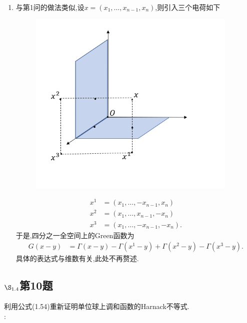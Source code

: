 \documentclass[12pt, a4paper]{ctexbook}
\begin{document}
\begin{enumerate}
        \item 与第1问的做法类似,设$x=(x_1, \dots ,x_{n−1}, x_n)$,则引入三个电荷如下
        \begin{figure}[htbp]
            \centering
            \includegraphics[width=10cm]{PDE1_4_9_2.jpg}
        \end{figure}
        \begin{align*}
        x^1&=(x_1, \dots ,-x_{n−1}, x_n)\\
        x^2&=(x_1, \dots ,x_{n−1}, -x_n)\\
        x^3&=(x_1, \dots ,-x_{n−1},- x_n).
        \end{align*}
        于是,四分之一全空间上的Green函数为
        \begin{align*}
        G(x-y)&=\Gamma(x-y)-\Gamma(x^1-y)+\Gamma(x^2-y)-\Gamma(x^3-y).
        \end{align*}
        具体的表达式与维数有关,此处不再赘述.
    \end{enumerate}
    
    \subsection{$\S_{1.4}$第10题}
    \kaishu{}利用公式(1.54)重新证明单位球上调和函数的Harnack不等式.\\
    
    \songti{}:\\
    
\end{document}
